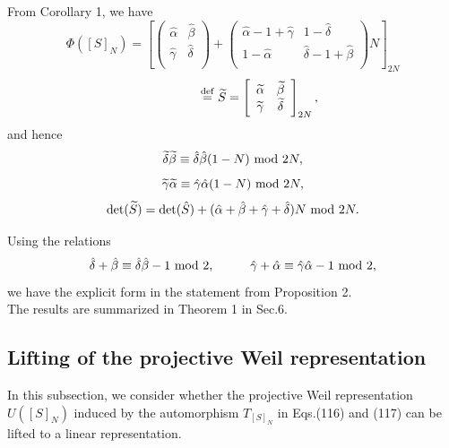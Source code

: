 \documentclass[12pt]{iopart}
\newcommand{\deq}{\stackrel{\rm{\tiny def}}{=}}
\begin{document}
From Corollary 1, we have
\[
\Phi([S]_N)
=
\left[
\left(\begin{array}{cc}
\hat\alpha & \hat\beta \\
\hat\gamma & \hat\delta \\
\end{array}\right)
+
\left(\begin{array}{cc}
\hat\alpha-1+\hat\gamma & 1-\hat\delta \\
1-\hat\alpha & \hat\delta-1+\hat\beta \\
\end{array}\right)N
\right]_{2N}
\]
\begin{equation}
\hspace{15mm}
\deq
\widetilde S
=
\left[\begin{array}{cc}
\widetilde\alpha & \widetilde\beta \\
\widetilde\gamma & \widetilde\delta \\
\end{array}\right]_{2N},
\end{equation}
and hence
\begin{equation}
\widetilde\delta\widetilde\beta
\equiv
\hat\delta\hat\beta(1-N)
\ {\rm mod}\ 2N,
\end{equation}
\begin{equation}
\widetilde\gamma\widetilde\alpha
\equiv
\hat\gamma\hat\alpha(1-N)
\ {\rm mod}\ 2N,
\end{equation}
\begin{equation}
{\rm det}(\widetilde S)
=
{\rm det}(\hat S)+(\hat\alpha+\hat\beta+\hat\gamma+\hat\delta)N
\ {\rm mod}\ 2N.
\end{equation}

Using the relations
\begin{equation}
\hat\delta+\hat\beta
\equiv
\hat\delta\hat\beta-1
\ {\rm mod}\ 2,
\hspace{10mm}
\hat\gamma+\hat\alpha
\equiv
\hat\gamma\hat\alpha-1
\ {\rm mod}\ 2,
\end{equation}
we have the explicit form in the statement from Proposition 2.
\\

The results are summarized in Theorem 1 in Sec.6.
\\

\subsection{Lifting of the projective Weil representation}
In this subsection, we consider whether the projective Weil representation \(U([S]_N)\)
induced by the automorphism \(T_{[S]_N}\) in Eqs.(116) and (117) can be lifted to a linear representation.
\end{document}
